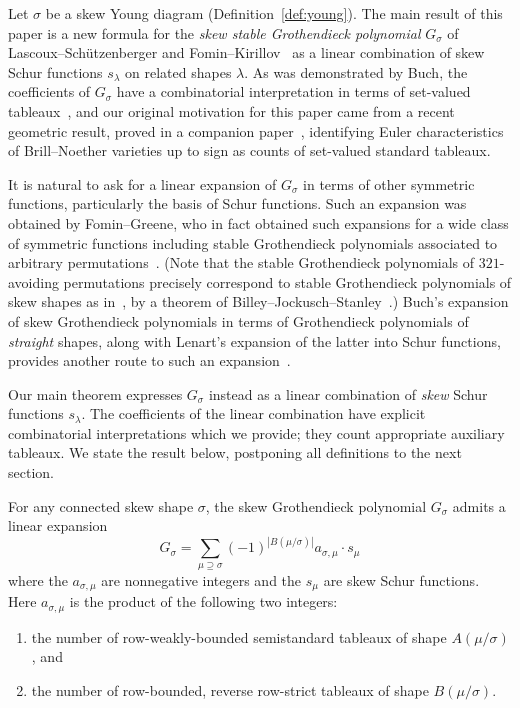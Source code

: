 
\noindent 
Let $\sigma$ be a skew Young diagram (Definition~\ref{def:young}).
The main result of this paper is a new formula for the \emph{skew stable Grothendieck polynomial} $G_\sigma$ of Lascoux--Sch{\"u}tzenberger and Fomin--Kirillov~\cite{fomin-kirillov-grothendieck,lascoux-schutzenberger} as a linear combination of skew Schur functions $s_\lambda$ on related shapes $\lambda$. As was demonstrated by Buch, the coefficients of $G_\sigma$ have a combinatorial interpretation in terms of set-valued tableaux~\cite{buch-littlewood-richardson}, and
our original motivation for this paper came from a recent geometric result, proved in a companion paper~\cite{chan-pflueger-euler}, identifying Euler characteristics of Brill--Noether varieties up to sign as counts of set-valued standard tableaux. 

It is natural to ask for a linear expansion of $G_\sigma$ in terms of other symmetric functions, particularly the basis of Schur functions. 
Such an expansion was obtained by Fomin--Greene, who in fact obtained such expansions for a wide class of symmetric functions including stable Grothendieck polynomials associated to arbitrary permutations~\cite{fomin-greene-noncommutative}. (Note that the stable Grothendieck polynomials of $321$-avoiding permutations precisely correspond to stable Grothendieck polynomials of skew shapes as in~\cite{buch-littlewood-richardson}, by a theorem of Billey--Jockusch--Stanley~\cite{billey-jockusch-stanley-some}.) Buch's expansion of skew Grothendieck polynomials in terms of Grothendieck polynomials of \emph{straight} shapes, along with Lenart's expansion of the latter into Schur functions, provides another route to such an expansion~\cite{buch-littlewood-richardson,lenart-combinatorial}. 

Our main theorem expresses $G_\sigma$ instead as a linear combination of \emph{skew} Schur functions $s_\lambda$. 
The coefficients of the linear combination have explicit combinatorial interpretations which we provide; they count appropriate auxiliary tableaux. We state the result below, postponing all definitions to the next section.

\begin{theo}\label{thm:comb}
For any connected skew shape $\sigma$, the skew Grothendieck polynomial $G_\sigma$ admits a linear expansion 
\[
G_\sigma = \sum_{\mu\supseteq \sigma} (-1)^{|B(\mu/\sigma)|} a_{\sigma,\mu} \cdot s_\mu
\]
where the $a_{\sigma, \mu}$ are nonnegative integers and the $s_\mu$ are skew Schur functions. Here $a_{\sigma,\mu}$ is the product of the following two integers:


\begin{enumerate}
\item\label{theo1.1_1} the number of row-weakly-bounded semistandard tableaux of shape $A(\mu/\sigma)$, and
\item\label{theo1.1_2} the number of row-bounded, reverse row-strict tableaux of shape $B(\mu/\sigma)$.
\end{enumerate}
\end{theo}

